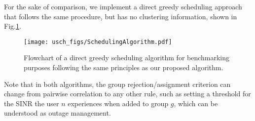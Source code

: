 For the sake of comparison, we implement a direct greedy scheduling approach that follows the same procedure, but has no clustering information, shown in Fig.\ref{fig:direct_greedy_scheduling}.
\begin{figure}[tbp]
	\centering
	\texttt{[image: usch\_figs/SchedulingAlgorithm.pdf]}
	\caption{Flowchart of a direct greedy scheduling algorithm for benchmarking purposes following the same principles as our proposed algorithm.}
	\label{fig:direct_greedy_scheduling}
\end{figure}

Note that in both algorithms, the group rejection/assignment criterion can change from pairwise correlation to any other rule, such as setting a threshold for the SINR the user $n$ experiences when added to group $g$, which can be understood as outage management.




